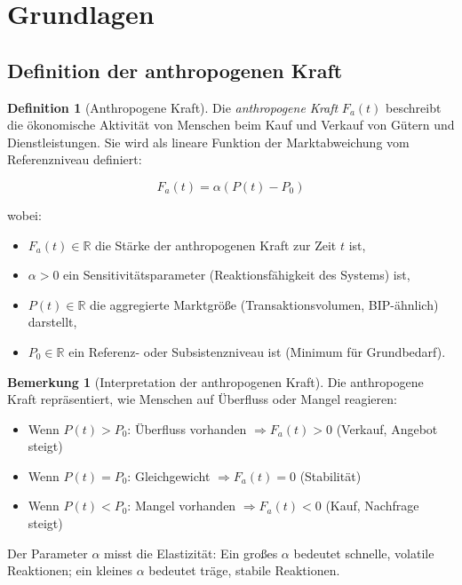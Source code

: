 \documentclass[a4paper, 12pt, twoside, openright]{report}
\theoremstyle{definition}
\newtheorem{definition}[theorem]{Definition}
\theoremstyle{definition}
\newtheorem{bemerkung}{Bemerkung}[chapter]
\begin{document}
\section{Grundlagen}

\subsection{Definition der anthropogenen Kraft}

\begin{definition}[Anthropogene Kraft]\label{def:anthropogene}
    Die \emph{anthropogene Kraft} $F_a(t)$ beschreibt die ökonomische Aktivität von Menschen beim Kauf und Verkauf von Gütern und Dienstleistungen. Sie wird als lineare Funktion der Marktabweichung vom Referenzniveau definiert:
    
    \begin{equation}
        \boxed{F_a(t) = \alpha(P(t) - P_0)}
        \label{eq:anthropogene}
    \end{equation}
    
    wobei:
    \begin{itemize}
        \item $F_a(t) \in \mathbb{R}$ die Stärke der anthropogenen Kraft zur Zeit $t$ ist,
        \item $\alpha > 0$ ein Sensitivitätsparameter (Reaktionsfähigkeit des Systems) ist,
        \item $P(t) \in \mathbb{R}$ die aggregierte Marktgröße (Transaktionsvolumen, BIP-ähnlich) darstellt,
        \item $P_0 \in \mathbb{R}$ ein Referenz- oder Subsistenzniveau ist (Minimum für Grundbedarf).
    \end{itemize}
\end{definition}

\begin{bemerkung}[Interpretation der anthropogenen Kraft]
    
    Die anthropogene Kraft repräsentiert, wie Menschen auf Überfluss oder Mangel reagieren:
    
    \begin{itemize}
        \item Wenn $P(t) > P_0$: Überfluss vorhanden $\Rightarrow F_a(t) > 0$ (Verkauf, Angebot steigt)
        \item Wenn $P(t) = P_0$: Gleichgewicht $\Rightarrow F_a(t) = 0$ (Stabilität)
        \item Wenn $P(t) < P_0$: Mangel vorhanden $\Rightarrow F_a(t) < 0$ (Kauf, Nachfrage steigt)
    \end{itemize}
    
    Der Parameter $\alpha$ misst die Elastizität: Ein großes $\alpha$ bedeutet schnelle, volatile Reaktionen; ein kleines $\alpha$ bedeutet träge, stabile Reaktionen.
\end{bemerkung}
\end{document}
